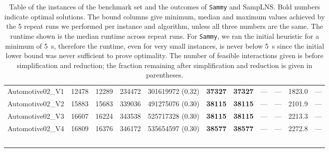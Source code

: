 \begin{table*}
\begin{tiny}
{{\begin{tabular}{lrrrrrrrrrr}
Automotive02\_V1 & \num[text-series-to-math=true]{12478} & \num[text-series-to-math=true]{12289} & \num[text-series-to-math=true]{234472} & \num[text-series-to-math=true]{301619972} (\num[text-series-to-math=true]{0.32}) & \textbf{\num[text-series-to-math=true]{37327}} & \textbf{\num[text-series-to-math=true]{37327}} & --- & --- & 1823.0 & ---\\
Automotive02\_V2 & \num[text-series-to-math=true]{15883} & \num[text-series-to-math=true]{15683} & \num[text-series-to-math=true]{339036} & \num[text-series-to-math=true]{491275076} (\num[text-series-to-math=true]{0.30}) & \textbf{\num[text-series-to-math=true]{38115}} & \textbf{\num[text-series-to-math=true]{38115}} & --- & --- & 2101.9 & ---\\
Automotive02\_V3 & \num[text-series-to-math=true]{16607} & \num[text-series-to-math=true]{16224} & \num[text-series-to-math=true]{343538} & \num[text-series-to-math=true]{525717328} (\num[text-series-to-math=true]{0.30}) & \textbf{\num[text-series-to-math=true]{38115}} & \textbf{\num[text-series-to-math=true]{38115}} & --- & --- & 2213.3 & ---\\
Automotive02\_V4 & \num[text-series-to-math=true]{16809} & \num[text-series-to-math=true]{16376} & \num[text-series-to-math=true]{346172} & \num[text-series-to-math=true]{535654597} (\num[text-series-to-math=true]{0.30}) & \textbf{\num[text-series-to-math=true]{38577}} & \textbf{\num[text-series-to-math=true]{38577}} & --- & --- & 2272.8 & ---\\
\hline\ \\
\end{tabular}}}
\end{tiny}
\caption{Table of the instances of the benchmark set and the outcomes of \texttt{Sammy} and SampLNS.
Bold numbers indicate optimal solutions.
The bound columns give minimum, median and maximum values achieved by the \num{5} repeat runs we performed per instance and algorithm, unless all three numbers are the same.
The runtime shown is the median runtime across repeat runs.
For \texttt{Sammy}, we ran the initial heuristic for a minimum of \qty{5}{s}, therefore the runtime, even for very small instances,
is never below \qty{5}{s} since the initial lower bound was never sufficient to prove optimality.
The number of feasible interactions given is before simplification and reduction;
the fraction remaining after simplification and reduction is given in parentheses.}
\label{tab:instance_summary}
\end{table*}
      
